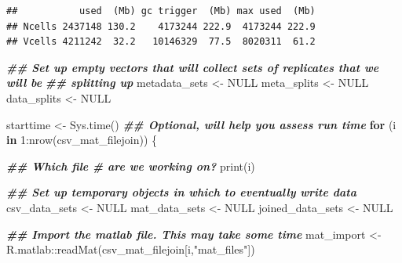 \documentclass[
]{book}
\newenvironment{Shaded}{\begin{snugshade}}{\end{snugshade}}
\newcommand{\ConstantTok}[1]{\textcolor[rgb]{0.00,0.00,0.00}{#1}}
\newcommand{\ControlFlowTok}[1]{\textcolor[rgb]{0.13,0.29,0.53}{\textbf{#1}}}
\newcommand{\DecValTok}[1]{\textcolor[rgb]{0.00,0.00,0.81}{#1}}
\newcommand{\DocumentationTok}[1]{\textcolor[rgb]{0.56,0.35,0.01}{\textbf{\textit{#1}}}}
\newcommand{\FunctionTok}[1]{\textcolor[rgb]{0.00,0.00,0.00}{#1}}
\newcommand{\NormalTok}[1]{#1}
\newcommand{\OtherTok}[1]{\textcolor[rgb]{0.56,0.35,0.01}{#1}}
\newcommand{\SpecialCharTok}[1]{\textcolor[rgb]{0.00,0.00,0.00}{#1}}
\newcommand{\StringTok}[1]{\textcolor[rgb]{0.31,0.60,0.02}{#1}}
\begin{document}
\begin{verbatim}
##           used  (Mb) gc trigger  (Mb) max used  (Mb)
## Ncells 2437148 130.2    4173244 222.9  4173244 222.9
## Vcells 4211242  32.2   10146329  77.5  8020311  61.2
\end{verbatim}

\begin{Shaded}
\begin{Highlighting}[]
\DocumentationTok{\#\# Set up empty vectors that will collect sets of replicates that we will be}
\DocumentationTok{\#\# splitting up}
\NormalTok{metadata\_sets }\OtherTok{\textless{}{-}} \ConstantTok{NULL}
\NormalTok{meta\_splits }\OtherTok{\textless{}{-}} \ConstantTok{NULL}
\NormalTok{data\_splits }\OtherTok{\textless{}{-}} \ConstantTok{NULL}

\NormalTok{starttime }\OtherTok{\textless{}{-}} \FunctionTok{Sys.time}\NormalTok{() }\DocumentationTok{\#\# Optional, will help you assess run time}
\ControlFlowTok{for}\NormalTok{ (i }\ControlFlowTok{in} \DecValTok{1}\SpecialCharTok{:}\FunctionTok{nrow}\NormalTok{(csv\_mat\_filejoin)) \{}

  \DocumentationTok{\#\# Which file \# are we working on?}
  \FunctionTok{print}\NormalTok{(i)}

  \DocumentationTok{\#\# Set up temporary objects in which to eventually write data}
\NormalTok{  csv\_data\_sets }\OtherTok{\textless{}{-}} \ConstantTok{NULL}
\NormalTok{  mat\_data\_sets }\OtherTok{\textless{}{-}} \ConstantTok{NULL}
\NormalTok{  joined\_data\_sets }\OtherTok{\textless{}{-}} \ConstantTok{NULL}

  \DocumentationTok{\#\# Import the matlab file. This may take some time}
\NormalTok{  mat\_import }\OtherTok{\textless{}{-}}
\NormalTok{    R.matlab}\SpecialCharTok{::}\FunctionTok{readMat}\NormalTok{(csv\_mat\_filejoin[i,}\StringTok{"mat\_files"}\NormalTok{])}


\end{Highlighting}
\end{Shaded}
\end{document}
